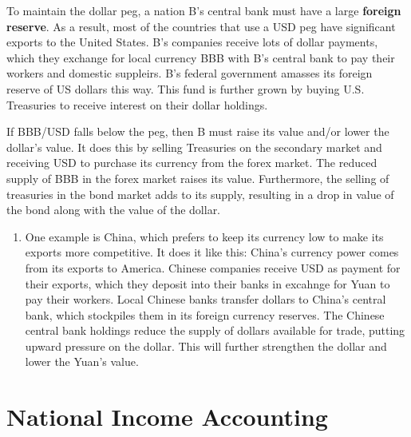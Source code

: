 \documentclass{article}
\begin{document}
    To maintain the dollar peg, a nation B's central bank must have a large \textbf{foreign reserve}. As a result, most of the countries that use a USD peg have significant exports to the United States. B's companies receive lots of dollar payments, which they exchange for local currency BBB with B's central bank to pay their workers and domestic suppleirs. B's federal government amasses its foreign reserve of US dollars this way. This fund is further grown by buying U.S. Treasuries to receive interest on their dollar holdings.

    \begin{center}
    \end{center}

    If BBB/USD falls below the peg, then B must raise its value and/or lower the dollar's value. It does this by selling Treasuries on the secondary market and receiving USD to purchase its currency from the forex market. The reduced supply of BBB in the forex market raises its value. Furthermore, the selling of treasuries in the bond market adds to its supply, resulting in a drop in value of the bond along with the value of the dollar.

    \begin{center}
    \end{center}

    \begin{enumerate}
      \item One example is China, which prefers to keep its currency low to make its exports more competitive. It does it like this: China's currency power comes from its exports to America. Chinese companies receive USD as payment for their exports, which they deposit into their banks in excahnge for Yuan to pay their workers. Local Chinese banks transfer dollars to China's central bank, which stockpiles them in its foreign currency reserves. The Chinese central bank holdings reduce the supply of dollars available for trade, putting upward pressure on the dollar. This will further strengthen the dollar and lower the Yuan's value.
    \end{enumerate}

\section{National Income Accounting}
\end{document}
